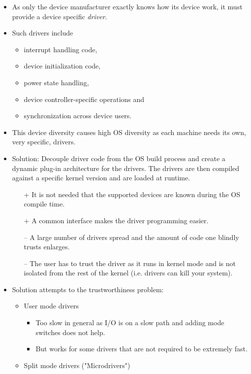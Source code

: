 		\begin{itemize}
			\item As only the device manufacturer exactly knows how its device work, it must provide a device specific \textit{driver}.
			\item Such drivers include
				\begin{itemize}
					\item interrupt handling code,
					\item device initialization code,
					\item power state handling,
					\item device controller-specific operations and
					\item synchronization across device users.
				\end{itemize}
			\item This device diversity causes high OS diversity as each machine needs its own, very specific, drivers.
			\item Solution: Decouple driver code from the OS build process and create a dynamic plug-in architecture for the drivers. The drivers are then compiled against a specific kernel version and are loaded at runtime.
				\begin{itemize}
					\item[+] It is not needed that the supported devices are known during the OS compile time.
					\item[+] A common interface makes the driver programming easier.
					\item[--] A large number of drivers spread and the amount of code one blindly trusts enlarges.
					\item[--] The user has to trust the driver as it runs in kernel mode and is not isolated from the rest of the kernel (i.e. drivers can kill your system).
				\end{itemize}
			\item Solution attempts to the trustworthiness problem:
				\begin{itemize}
					\item User mode drivers
						\begin{itemize}
							\item Too slow in general as I/O is on a slow path and adding mode switches does not help.
							\item But works for some drivers that are not required to be extremely fast.
						\end{itemize}
					\item Split mode drivers ("Microdrivers")

\end{itemize}
\end{itemize}
